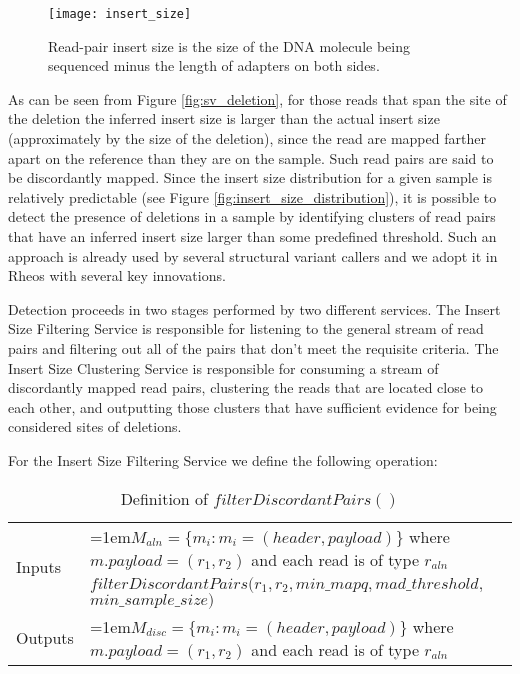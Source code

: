 \begin{figure}[H]
    \texttt{[image: insert\_size]}
    \centering
    \caption {Read-pair insert size is the size of the DNA molecule being sequenced minus the length of adapters on both sides\autocite{turner2014assessment}.}
    \label{fig:insert_size}
\end{figure}

As can be seen from Figure \ref{fig:sv_deletion}, for those reads that span the site of the deletion the inferred insert size is larger than the actual insert size (approximately by the size of the deletion), since the read are mapped farther apart on the reference than they are on the sample. Such read pairs are said to be discordantly mapped. Since the insert size distribution for a given sample is relatively predictable (see Figure \ref{fig:insert_size_distribution}), it is possible to detect the presence of deletions in a sample by identifying clusters of read pairs that have an inferred insert size larger than some predefined threshold. Such an approach is already used by several structural variant callers\autocites{rausch2012delly}{layer2014lumpy} and we adopt it in Rheos with several key innovations.

Detection proceeds in two stages performed by two different services. The Insert Size Filtering Service is responsible for listening to the general stream of read pairs and filtering out all of the pairs that don't meet the requisite criteria. The Insert Size Clustering Service is responsible for consuming a stream of discordantly mapped read pairs, clustering the reads that are located close to each other, and outputting those clusters that have sufficient evidence for being considered sites of deletions.

For the Insert Size Filtering Service we define the following operation:

\bgroup
\def\arraystretch{1.5}
\begin{table}[!ht]
    \caption{Definition of $filterDiscordantPairs()$}
    \label{tab:op_filter_discordant_pairs}
    {\begin{tabular}{l|p{12cm}}
    \toprule
    \multirow{2}{*}{Inputs} & \hangindent=1em$M_{aln} = \{m_i: m_i = (header, payload)\}$ where $m.payload = (r_1,r_2)$ and each read is of type $r_{aln}$\\
    \cline{2-2}
    \multirow{2}{*}{Operation} & $filterDiscordantPairs(r_1,r_2, min\_mapq, mad\_threshold,$ $min\_sample\_size)$\\
     \cline{2-2}
    \multirow{2}{*}{Outputs} & \hangindent=1em$M_{disc} = \{m_i: m_i = (header, payload)\}$ where $m.payload = (r_1,r_2)$ and each read is of type $r_{aln}$\\
    \bottomrule
    \end{tabular}}
\end{table}
\egroup

